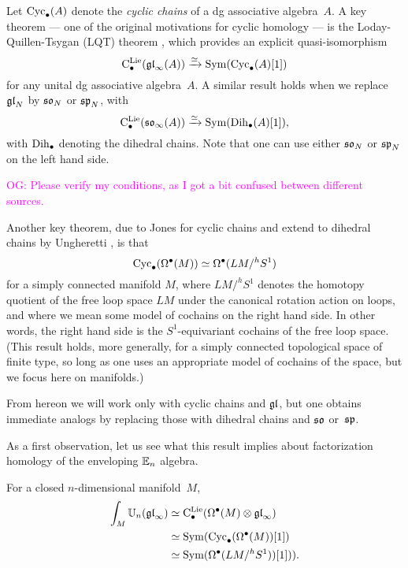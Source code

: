 \documentclass[11pt]{amsart}
\numberwithin{equation}{section}
\def\owen{\textcolor{magenta}{OG: }\textcolor{magenta}}
\begin{document}
Let ${\rm Cyc}_\bullet(A)$ denote the {\em cyclic chains} of a dg associative algebra~$A$.
A key theorem --- one of the original motivations for cyclic homology --- is the Loday-Quillen-Tsygan (LQT) theorem \cite{},
which provides an explicit quasi-isomorphism
\begin{equation}
\label{eqn: LQT}
{\rm C}^{\rm Lie}_\bullet({\mathfrak{gl}}_\infty(A)) \xrightarrow{\simeq} {\rm Sym}({\rm Cyc}_\bullet(A)[1])
\end{equation}
for any unital dg associative algebra~$A$.
A similar result \cite{} holds when we replace ${\mathfrak{gl}}_N$ by $\frak{so}_N$ or $\frak{sp}_N$, with
\[
\label{eqn: LQT}
{\rm C}^{\rm Lie}_\bullet({\frak{so}}_\infty(A)) \xrightarrow{\simeq} {\rm Sym}({\rm Dih}_\bullet(A)[1]),
\]
with ${\rm Dih}_\bullet$ denoting the dihedral chains.
Note that one can use either $\frak{so}_N$ or $\frak{sp}_N$ on the left hand side.

\owen{Please verify my conditions, as I got a bit confused between different sources.}

Another key theorem, due to Jones \cite{} for cyclic chains and extend to dihedral chains by Ungheretti \cite{},
is that
\[
{\rm Cyc}_\bullet(\Omega^\bullet(M)) \simeq \Omega^\bullet(LM/^h S^1)
\]
for a simply connected manifold $M$, 
where $LM/^h S^1$ denotes the homotopy quotient of the free loop space $LM$ under the canonical rotation action on loops,
and where we mean some model of cochains on the right hand side.
In other words, the right hand side is the $S^1$-equivariant cochains of the free loop space.
(This result holds, more generally, for a simply connected topological space of finite type, so long as one uses an appropriate model of cochains of the space, 
but we focus here on manifolds.)

From hereon we will work only with cyclic chains and ${\mathfrak{gl}}$,
but one obtains immediate analogs by replacing those with dihedral chains and $\frak{so}$ or~$\frak{sp}$.

As a first observation, let us see what this result implies about factorization homology of the enveloping $\mathbb E_n$ algebra.

\begin{lmm}
For a closed $n$-dimensional manifold~$M$, 
\begin{align*}
\int_M \mathbb U_n(\frak{gl}_\infty)
&\simeq {\rm C}^{\rm Lie}_\bullet(\Omega^\bullet(M) \otimes {\mathfrak{gl}}_\infty) \\
&\simeq {\rm Sym}({\rm Cyc}_\bullet(\Omega^\bullet(M))[1]) \\
&\simeq {\rm Sym}(\Omega^\bullet(LM/^h S^1))[1])).
\end{align*}
\end{lmm}
\end{document}
